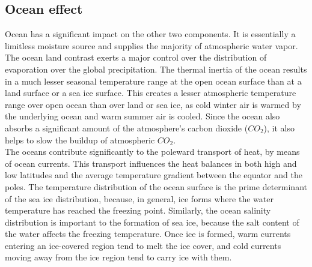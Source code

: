 \subsection{Ocean effect}
Ocean has a significant impact on the other two components. It is essentially a limitless moisture source and supplies the majority of atmospheric water vapor. The ocean land contrast exerts a major control over the distribution of evaporation over the global precipitation. The thermal inertia of the ocean results in a much lesser seasonal temperature range at the open ocean surface than at a land surface or a sea ice surface.
This creates a lesser atmospheric temperature range over open ocean than over land or sea ice, as cold winter air is warmed by the underlying ocean and warm summer air is cooled. %
Since the ocean also absorbs a significant amount of the atmosphere’s carbon dioxide ($CO_2$), it also helps to slow the buildup of atmospheric $CO_2$. \\
[0.1 cm]
The oceans contribute significantly to the poleward transport of heat, by means of ocean currents. This transport influences the heat balances in both high and low latitudes and the average temperature gradient between the equator and the poles. The temperature distribution of the ocean surface is the prime determinant of the sea ice distribution, because, in general, ice forms where the water temperature has reached the freezing point. Similarly, the ocean salinity distribution is important to the formation of sea ice, because the salt content of the water affects the freezing temperature. Once ice is formed, warm currents entering an ice-covered region tend to melt the ice cover, and cold currents moving away from the ice region tend to carry ice with them.


